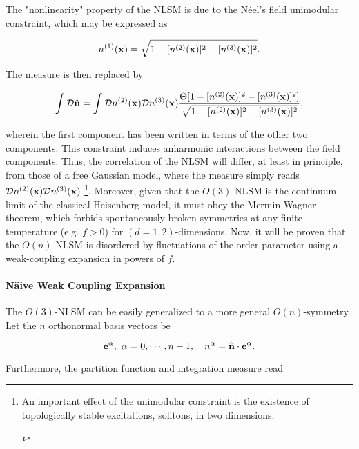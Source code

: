 The "nonlinearity" property of the NLSM is due to the Néel's field unimodular constraint, which may be expressed as 

\begin{equation}
    n^{(1)}({\bf x}) = \sqrt{1 - [n^{(2)}({\bf x})]^2 - [n^{(3)}({\bf x})]^2}. 
\end{equation}

The measure is then replaced by 

\begin{equation}
    \int \mathcal{D}\hat{{\bf n}} = \int \mathcal{D}n^{(2)}({\bf x}) \mathcal{D}n^{(3)}({\bf x}) \frac{\Theta[1 - [n^{(2)}({\bf x})]^2 - [n^{(3)}({\bf x})]^2]}{\sqrt{1 - [n^{(2)}({\bf x})]^2 - [n^{(3)}({\bf x})]^2}},
\end{equation}

wherein the first component has been written in terms of the other two components. This constraint induces anharmonic interactions between the field components. Thus, the correlation of the NLSM will differ, at least in principle, from those of a free Gaussian model, where the measure simply reads $\mathcal{D}n^{(2)}({\bf x}) \mathcal{D}n^{(3)}({\bf x})$ \footnote{
\begin{tcolorbox}[colback = yellow, title = Physical Context]

An important effect of the unimodular constraint is the existence of topologically stable excitations, solitons, in two dimensions. 

\end{tcolorbox}}. 
Moreover, given that the $O(3)$-NLSM is the continuum limit of the classical Heisenberg model, it must obey the Mermin-Wagner theorem, which forbids spontaneously broken symmetries at any finite temperature (e.g. $f>0$) for $(d=1,2)$-dimensions. Now, it will be proven that the $O(n)$-NLSM is disordered by fluctuations of the order parameter using a weak-coupling expansion in powers of $f$. 
\bigbreak

\paragraph{N\"aive Weak Coupling Expansion}

The $O(3)$-NLSM can be easily generalized to a more general $O(n)$-symmetry. Let the $n$ orthonormal basis vectors be 

$$
    {\bf e}^\alpha, \textnormal{ } \alpha = 0, \cdots, n-1, \quad n^{\alpha} = \hat{\bf n} \cdot {\bf e}^\alpha.
$$

Furthermore, the partition function and integration measure read

